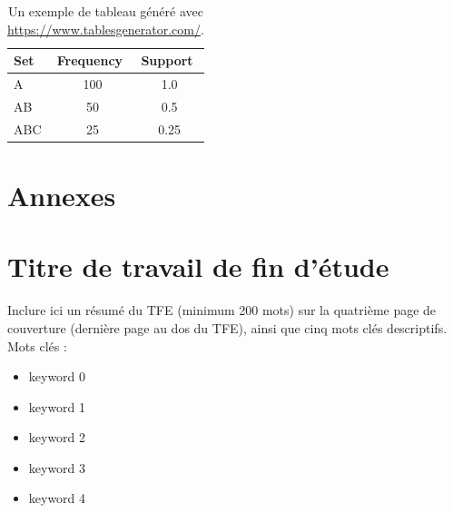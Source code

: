 \documentclass{HELBreport}
\begin{document}
\begin{table}[h!]
\centering
\begin{tabular}{|l|c|c|}
\hline
\rowcolor[HTML]{CBCEFB} 
\textbf{Set} & \multicolumn{1}{l|}{\cellcolor[HTML]{CBCEFB}\textbf{Frequency}} & \multicolumn{1}{l|}{\cellcolor[HTML]{CBCEFB}\textbf{Support}} \\ \hline
A            & 100                                                             & 1.0                                                           \\ \hline
AB           & 50                                                              & 0.5                                                           \\ \hline
ABC          & 25                                                              & 0.25                                                          \\ \hline
\end{tabular}
\caption{Un exemple de tableau généré avec \url{https://www.tablesgenerator.com/}.}
\label{table:1}
\end{table}

\nocite{*}

\printbibliography

\chapter{Annexes}

\chapter*{Titre de travail de fin d’étude}
\thispagestyle{empty} %

Inclure ici un résumé du TFE (minimum 200 mots) sur la quatrième page de couverture
(dernière page au dos du TFE), ainsi que cinq mots clés descriptifs.\\

\Large Mots clés : \normalsize
\begin{itemize}
    \item keyword 0
    \item keyword 1
    \item keyword 2
    \item keyword 3
    \item keyword 4
\end{itemize}
\end{document}
